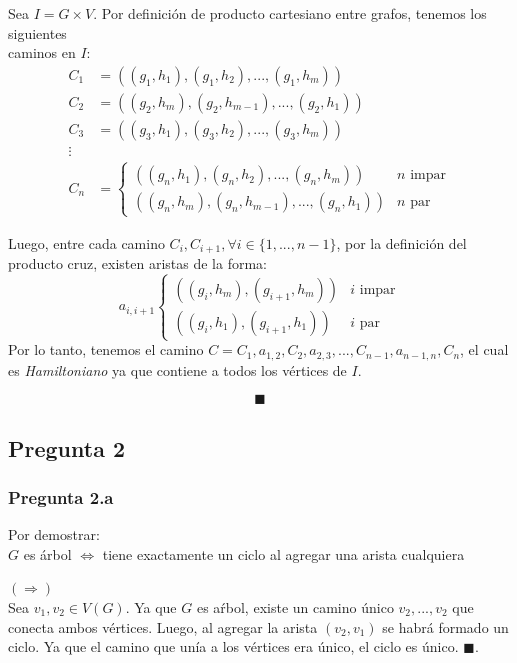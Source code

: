 \documentclass[12pt]{article}
\begin{document}
Sea $I = G \times V$. Por definición de producto cartesiano entre grafos, tenemos los siguientes \\
caminos en $I$:
\begin{align*}
C_1 &= ((g_1, h_1), (g_1, h_2), ... , (g_1, h_m)) \\
C_2 &= ((g_2, h_m), (g_2, h_{m-1}), ... , (g_2, h_1)) \\
C_3 &= ((g_3, h_1), (g_3, h_2), ... , (g_3, h_m)) \\
\vdots \\
C_n &= \begin{cases} 
      ((g_n, h_1), (g_n, h_2), ... , (g_n, h_m)) & n \textrm{ impar} \\
      ((g_n, h_m), (g_n, h_{m-1}), ... , (g_n, h_1)) & n \textrm{ par}  
\end{cases}
\end{align*}

\newpage

Luego, entre cada camino $C_i, C_{i+1}, \forall i \in \{1,...,n-1\}$, por la definición del producto cruz, existen aristas de la forma: \\
\[
a_{i,i+1}
\begin{cases} 
      ((g_i, h_m), (g_{i+1}, h_m)) & i \textrm{ impar} \\
      ((g_i, h_1), (g_{i+1}, h_1)) & i \textrm{ par}  
\end{cases}
\]
Por lo tanto, tenemos el camino $C = C_1, a_{1,2}, C_2, a_{2,3}, ..., C_{n-1}, a_{n-1, n}, C_n$, el cual es \textit{Hamiltoniano} ya que contiene a todos los vértices de $I$.

$$\blacksquare$$


\newpage
\subsection*{Pregunta 2}

\subsubsection*{Pregunta 2.a}
Por demostrar: \\
$G$ es árbol $\Leftrightarrow$ tiene exactamente un ciclo al agregar una arista cualquiera 

$(\Rightarrow)$ \\
Sea $v_1, v_2 \in V(G)$. Ya que $G$ es aŕbol, existe un camino único $v_2, ..., v_2$ que conecta ambos vértices. Luego, al agregar la arista $(v_2, v_1)$ se habrá formado un ciclo. Ya que el camino que unía a los vértices era único, el ciclo es único. $\blacksquare$. \\
\end{document}

